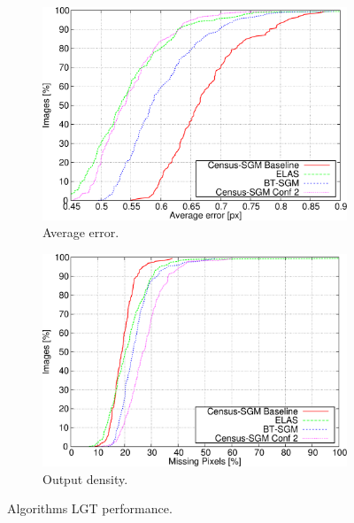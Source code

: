 \begin{figure}[p]
  \ContinuedFloat
  \begin{subfigure}[h]{\textwidth}
    \centering
    \includegraphics[width=\textwidth, height=0.4\textheight, trim=0 0 0 0, clip]{algo_avg_ee3}
    \caption{ Average error. }
    \label{fig:cp03_algorithms_LGT_avg}
  \end{subfigure}%

  \begin{subfigure}[h]{\textwidth}
    \centering
    \includegraphics[width=\textwidth, height=0.4\textheight, trim=0 0 0 0,clip]{algo_dens_ee3}
    \caption{ Output density. }
    \label{fig:cp03_algorithms_LGT_dens}
  \end{subfigure}%
  \caption{ Algorithms LGT performance. }
\end{figure}

